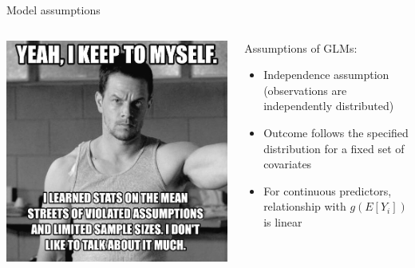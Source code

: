 \documentclass[ignorenonframetext,]{beamer}
\begin{document}
\begin{frame}{Model assumptions}

\begin{columns}
\begin{column}{0.5\textwidth}
\includegraphics{images/violated_assumptions.jpg}
\end{column}

\begin{column}{0.5\textwidth}
Assumptions of GLMs: 
\begin{itemize}
  \item Independence assumption (observations are independently distributed)
  \item Outcome follows the specified distribution for a fixed set of covariates
  \item For continuous predictors, relationship with $g(E[Y_i])$ is linear
\end{itemize}
\end{column}
\end{columns}

\end{frame}
\end{document}
